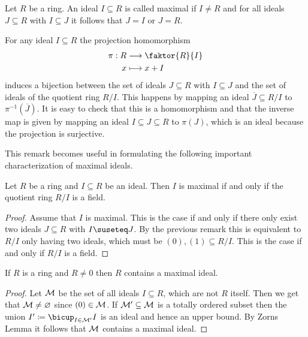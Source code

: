 \documentclass[../notes.tex]{subfiles}
\begin{document}
\begin{defi}{}{}
  Let $R$ be a ring. An ideal $I \subseteq R$ is called maximal if $I \neq R$ and for
  all ideals $J \subseteq R$ with $I \subseteq J$ it follows that $J = I$ or $J = R$.
\end{defi}

\begin{rem}{}{}
  For any ideal $I \subseteq R$ the projection homomorphism
  \begin{align*}
    \pi: R & \longrightarrow \faktor{R}{I} \\
    x & \longmapsto x + I
  \end{align*}
  induces a bijection between the set of ideals $J \subseteq R$ with $I \subseteq J$ and
  the set of ideals of the quotient ring $R/I$.
  This happens by mapping an ideal $\overline{J} \subseteq R/I$ to $\pi^{-1}(\overline{J})$.
  It is easy to check that this is a homomorphism and that the inverse map is given by
  mapping an ideal $I \subseteq J \subseteq R$ to $\pi(J)$, which is an ideal because
  the projection is surjective.
\end{rem}

\smallskip
\noindent
This remark becomes useful in formulating the following
important characterization of maximal ideals.

\smallskip
\begin{lemm}{}{}
  Let $R$ be a ring and $I \subseteq R$ be an ideal. Then $I$ is maximal if and only if
  the quotient ring $R/I$ is a field.
\end{lemm}

\begin{proof}
  Assume that $I$ is maximal. This is the case if and only if
  there only exist two ideals $J \subseteq R$
  with $I \suseteq J$. By the previous remark this is equivalent to
  $R/I$ only having two ideals, which must be $(0),(1) \subseteq R/I$. This is the
  case if and only if $R/I$ is a field.
\end{proof}

\begin{theo}{}{}
  If $R$ is a ring and $R \neq 0$ then $R$ contains a maximal ideal.
\end{theo}

\begin{proof}
  Let ${\mathcal{M}}$ be the set of all ideals $I \subseteq R$, which are not $R$ itself.
  Then we get that ${\mathcal{M}} \neq \varnothing$ since $(0) \in {\mathcal{M}}$. If ${\mathcal{M}}' \subseteq {\mathcal{M}}$
  is a totally ordered subset then the union $I' \coloneqq \bicup_{I \in \cM'} I$
  is an ideal and hence an upper bound. By Zorns Lemma it follows that ${\mathcal{M}}$ contains
  a maximal ideal.
  
\end{proof}
\end{document}
